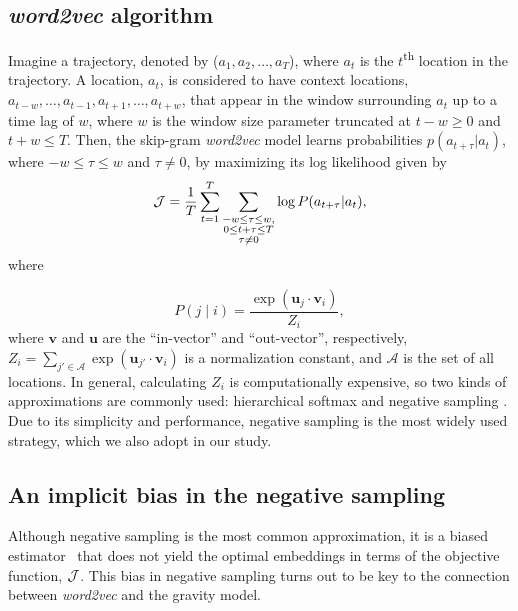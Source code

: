 \documentclass[12pt,a4paper]{article}
\newcommand{\vect}[1]{\boldsymbol{#1}}
\def\given{\mid}
\begin{document}
\subsection{\textit{word2vec} algorithm}
Imagine a trajectory, denoted by ($a_{1}, a_{2}, \ldots, a_{T}$), where $a_{t}$ is the $t$\textsuperscript{th} location in the trajectory. A location, $a_{t}$, is considered to have context locations, $a_{t-w}, \ldots, a_{t-1}, a_{t+1},\ldots, a_{t+w}$, that appear in the window surrounding $a_t$ up to a time lag of $w$, where $w$ is the window size parameter truncated at $t - w \geq 0$ and $t + w \leq T$.
Then, the skip-gram \textit{word2vec} model learns probabilities $p(a_{t + \tau} \vert a_{t})$, where $-w\leq \tau\leq w$ and $\tau \neq 0$,  by maximizing its log likelihood given by
%
%
\begin{equation}
	{\cal J} = \frac{1}{T}\sum_{t = 1}^{T} \sum_{ \substack{-w \leq \tau \leq w, \\ 0 \leq t+\tau \leq T \\\tau \neq 0}} \log P(a_{t + \tau} \vert a_{t}), \label{eq:word2vec-obj}
\end{equation}
where

%
%
\begin{equation}
	P(j \given i) = \frac{\exp(\vect{u}_j \cdot \vect{v}_{i})}{Z_i}, \label{eq:cond_prob_w2v}
\end{equation}
where $\vect{v}$ and $\vect{u}$ are the ``in-vector'' and ``out-vector'', respectively,  $Z_i=\sum_{j' \in \mathcal{A}} \exp(\vect{u}_{j'} \cdot \vect{v}_{i})$ is a normalization constant, and $\mathcal{A}$ is the set of all locations. In general, calculating $Z_i$ is computationally expensive, so two kinds of approximations are commonly used:
hierarchical softmax \autocite{morin2005hierarchical} and negative sampling \autocite{mikolov2013word2vec}.
Due to its simplicity and performance, negative sampling is the most widely used strategy, which we also adopt in our study.


\subsection{An implicit bias in the negative sampling}

Although negative sampling is the most common approximation, it is a biased estimator~\autocite{Chia2010,Dyer2014} that does not yield the optimal embeddings in terms of the objective function, ${\cal J}$.
This bias in negative sampling turns out to be key to the connection between {\it word2vec} and the gravity model.
\end{document}
